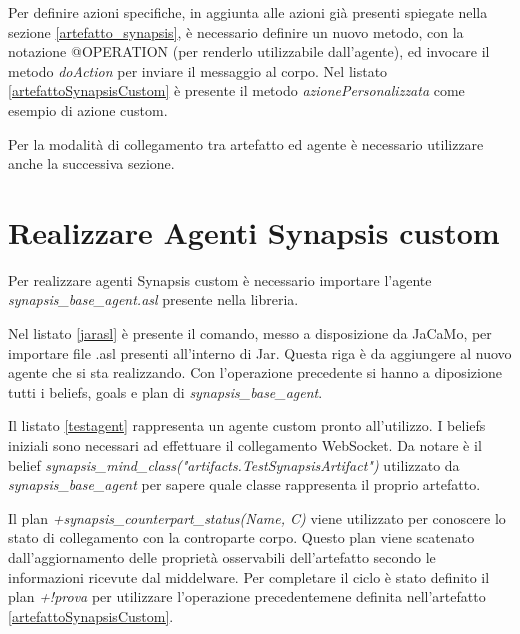 Per definire azioni specifiche, in aggiunta alle azioni già presenti spiegate nella sezione \ref{artefatto_synapsis}, è necessario definire un nuovo metodo, con la notazione @OPERATION (per renderlo utilizzabile dall'agente), ed invocare il metodo \textit{doAction} per inviare il messaggio al corpo. Nel listato  \ref{artefattoSynapsisCustom} è presente il metodo \textit{azionePersonalizzata} come esempio di azione custom.

\medskip

Per la modalità di collegamento tra artefatto ed agente è necessario utilizzare anche la successiva sezione.

\section{Realizzare Agenti Synapsis custom} \label{agente_custom}

Per realizzare agenti Synapsis custom è necessario importare l'agente \textit{synapsis\_base\_agent.asl} presente nella libreria. 



Nel listato \ref{jarasl} è presente il comando, messo a disposizione da JaCaMo, per importare file .asl presenti all'interno di Jar. Questa riga è da aggiungere al nuovo agente che si sta realizzando. Con l'operazione precedente si hanno a diposizione tutti i beliefs, goals e plan di \textit{synapsis\_base\_agent}.



Il listato \ref{testagent} rappresenta un agente custom pronto all'utilizzo. I beliefs iniziali sono necessari ad effettuare il collegamento WebSocket. Da notare è il belief \textit{synapsis\_mind\_class("artifacts.TestSynapsisArtifact")} utilizzato da \textit{synapsis\_base\_agent} per sapere quale classe rappresenta il proprio artefatto.

\medskip

Il plan \textit{+synapsis\_counterpart\_status(Name, C)} viene utilizzato per conoscere lo stato di collegamento con la controparte corpo. Questo plan viene scatenato dall'aggiornamento delle proprietà osservabili dell'artefatto secondo le informazioni ricevute dal middelware. Per completare il ciclo è stato definito il plan \textit{+!prova} per utilizzare l'operazione precedentemene definita nell'artefatto \ref{artefattoSynapsisCustom}.